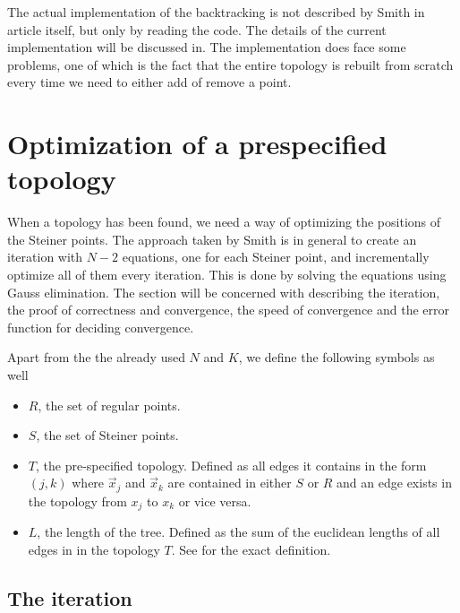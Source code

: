 The actual implementation of the backtracking is not described by Smith in
article itself, but only by reading the code. The details of the current
implementation will be discussed in. The implementation does face some problems, one of which is
the fact that the entire topology is rebuilt from scratch every time we need to
either add of remove a point.

\section{Optimization of a prespecified topology}
\label{sec:optim-presp-topol}

When a topology has been found, we need a way of optimizing the positions of the
Steiner points. The approach taken by Smith is in general to create an iteration
with $N-2$ equations, one for each Steiner point, and incrementally optimize all
of them every iteration. This is done by solving the equations using Gauss
elimination. The section will be concerned with describing the iteration, the
proof of correctness and convergence, the speed of convergence and the error
function for deciding convergence.

Apart from the the already used $N$ and $K$, we define the following symbols as
well
\begin{itemize}
\item $R$, the set of regular points.
\item $S$, the set of Steiner points.
\item $T$, the pre-specified topology. Defined as all edges it contains in the
  form $(j,k)$ where $\vec x_j$ and $\vec x_k$ are contained in either $S$ or
  $R$ and an edge exists in the topology from $x_j$ to $x_k$ or vice versa.
\item $L$, the length of the tree. Defined as the sum of the euclidean lengths
  of all edges in in the topology $T$. See  for the exact
  definition.
\end{itemize}


\subsection{The iteration}
\label{sec:iteration}

